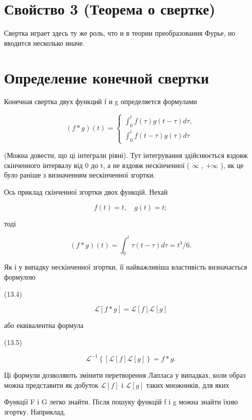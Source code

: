 \documentclass[
  ukrainian,
]{article}
\begin{document}
\section{Свойство 3 (Теорема о
свертке)}\label{ux441ux432ux43eux439ux441ux442ux432ux43e-3-ux442ux435ux43eux440ux435ux43cux430-ux43e-ux441ux432ux435ux440ux442ux43aux435}

Свертка играет здесь ту же роль, что и в теории преобразования Фурье, но
вводится несколько иначе.

\section{Определение конечной
свертки}\label{ux43eux43fux440ux435ux434ux435ux43bux435ux43dux438ux435-ux43aux43eux43dux435ux447ux43dux43eux439-ux441ux432ux435ux440ux442ux43aux438}

Конечная свертка двух функций f и g определяется формулами

\[
(f * g) (t) =
\begin{cases} \int_0^t f(\tau) g(t-\tau) d\tau, \\ \int_0^t f(t-\tau) g(\tau) d\tau \end{cases}
\]

(Можна довести, що ці інтеграли рівні). Тут інтегрування здійснюється
вздовж скінченного інтервалу від 0 до t, а не вздовж нескінченної (
\(\infty\) , \(+\infty\) ), як це було раніше з визначенням нескінченної
згортки.

Ось приклад скінченної згортки двох функцій. Нехай

\[
f(t) = t, \quad g(t) = t;
\]

тоді

\[
(f * g)(t) = \int_{0}^{t} \tau(t - \tau) d\tau = t^{3}/6.
\]

Як і у випадку нескінченної згортки, її найважливіша властивість
визначається формулою

(13.4)

\[
\mathscr{L}[f * g] = \mathscr{L}[f] \mathscr{L}[g]
\]

або еквівалентна формула

(13.5)

\[
\mathscr{L}^{-1}\left\{ \left[\mathscr{L}\left[f\right]\mathscr{L}\left[g\right]\right\} = f*g. \right.
\]

Ці формули дозволяють змінити перетворення Лапласа у випадках, коли
образ можна представити як добуток \(\mathscr{L}[f]\) і
\(\mathscr{L}[g]\) таких множників, для яких

Функції F і G легко знайти. Після пошуку функцій f і g можна знайти їхню
згортку. Наприклад,
\end{document}
